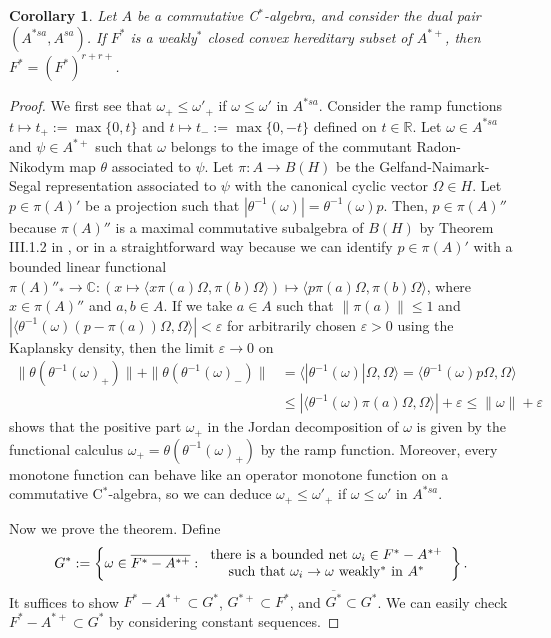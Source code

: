 \documentclass[noamsfonts,a4paper,10pt]{amsart}
\theoremstyle{plain}
\newtheorem{corollary}[theorem]{Corollary}
\theoremstyle{definition}
\begin{document}
\begin{corollary}
Let $A$ be a commutative C$^*$-algebra, and consider the dual pair $(A^{*sa},A^{sa})$.
If $F^*$ is a weakly$^*$ closed convex hereditary subset of $A^{*+}$, then $F^*=(F^*)^{r+r+}$.
\end{corollary}
\begin{proof}
We first see that $\omega_+\le\omega'_+$ if $\omega\le\omega'$ in $A^{*sa}$.
Consider the ramp functions $t\mapsto t_+:=\max\{0,t\}$ and $t\mapsto t_-:=\max\{0,-t\}$ defined on $t\in\mathbb{R}$.
Let $\omega\in A^{*sa}$ and $\psi\in A^{*+}$ such that $\omega$ belongs to the image of the commutant Radon-Nikodym map $\theta$ associated to $\psi$.
Let $\pi:A\to B(H)$ be the Gelfand-Naimark-Segal representation associated to $\psi$ with the canonical cyclic vector $\Omega\in H$.
Let $p\in\pi(A)'$ be a projection such that $|\theta^{-1}(\omega)|=\theta^{-1}(\omega)p$.
Then, $p\in\pi(A)''$ because $\pi(A)''$ is a maximal commutative subalgebra of $B(H)$ by Theorem III.1.2 in \cite{MR1873025}, or in a straightforward way because we can identify $p\in\pi(A)'$ with a bounded linear functional $\pi(A)''_*\to\mathbb{C}:(x\mapsto\langle x\pi(a)\Omega,\pi(b)\Omega\rangle)\mapsto\langle p\pi(a)\Omega,\pi(b)\Omega\rangle$, where $x\in\pi(A)''$ and $a,b\in A$.
If we take $a\in A$ such that $\|\pi(a)\|\le1$ and $|\langle\theta^{-1}(\omega)(p-\pi(a))\Omega,\Omega\rangle|<\varepsilon$ for arbitrarily chosen $\varepsilon>0$ using the Kaplansky density, then the limit $\varepsilon\to0$ on
\begin{align*}
\|\theta(\theta^{-1}(\omega)_+)\|+\|\theta(\theta^{-1}(\omega)_-)\|
&=\langle|\theta^{-1}(\omega)|\Omega,\Omega\rangle
=\langle\theta^{-1}(\omega)p\Omega,\Omega\rangle\\
&\le|\langle\theta^{-1}(\omega)\pi(a)\Omega,\Omega\rangle|+\varepsilon\le\|\omega\|+\varepsilon
\end{align*}
shows that the positive part $\omega_+$ in the Jordan decomposition of $\omega$ is given by the functional calculus $\omega_+=\theta(\theta^{-1}(\omega)_+)$ by the ramp function.
Moreover, every monotone function can behave like an operator monotone function on a commutative C$^*$-algebra, so we can deduce $\omega_+\le\omega'_+$ if $\omega\le\omega'$ in $A^{*sa}$.

Now we prove the theorem.
Define
\[G^*:=\left\{\omega\in\overline{F^*-A^{*+}}:\begin{tabular}{c}there is a bounded net $\omega_i\in F^*-A^{*+}$\\such that $\omega_i\to\omega$ weakly$^*$ in $A^*$\end{tabular}\right\}.\]
It suffices to show $F^*-A^{*+}\subset G^*$, $G^{*+}\subset F^*$, and $\overline{G^*}\subset G^*$.
We can easily check $F^*-A^{*+}\subset G^*$ by considering constant sequences.


\end{proof}
\end{document}
